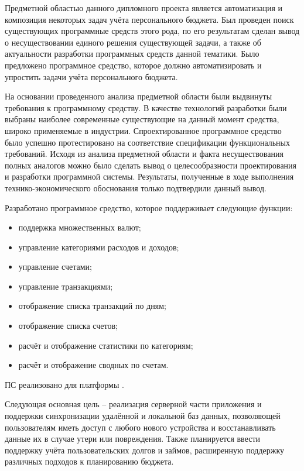 
Предметной областью данного дипломного проекта является автоматизация и композиция некоторых задач учёта персонального бюджета.
Был проведен поиск существующих программные средств этого рода, по его результатам сделан вывод о несуществовании единого решения существующей задачи, а также об актуальности разработки программных средств данной тематики.
Было предложено программное средство, которое должно автоматизировать и упростить задачи учёта персонального бюджета.

На основании проведенного анализа предметной области были выдвинуты требования к программному средству.
В качестве технологий разработки были выбраны наиболее современные существующие на данный момент средства, широко применяемые в индустрии.
Спроектированное программное средство было успешно протестировано на соответствие спецификации функциональных требований.
Исходя из анализа предметной области и факта несуществования полных аналогов можно было сделать вывод о целесообразности проектирования и разработки программной системы.
Результаты, полученные в ходе выполнения технико-экономического обоснования только подтвердили данный вывод.

Разработано программное средство, которое поддерживает следующие функции:
\begin{itemize}
    \item поддержка множественных валют;
    \item управление категориями расходов и доходов;
    \item управление счетами;
    \item управление транзакциями;
    \item отображение списка транзакций по дням;
    \item отображение списка счетов;
    \item расчёт и отображение статистики по категориям;
    \item расчёт и отображение сводных по счетам.
\end{itemize}

ПС реализовано для платформы \andro.

Следующая основная цель -- реализация серверной части приложения и поддержки синхронизации удалённой и локальной баз данных, позволяющей пользователям иметь доступ с любого нового устройства и восстанавливать данные их в случае утери или повреждения.
Также планируется ввести поддержку учёта пользовательских долгов и займов, расширенную поддержку различных подходов к планированию бюджета.